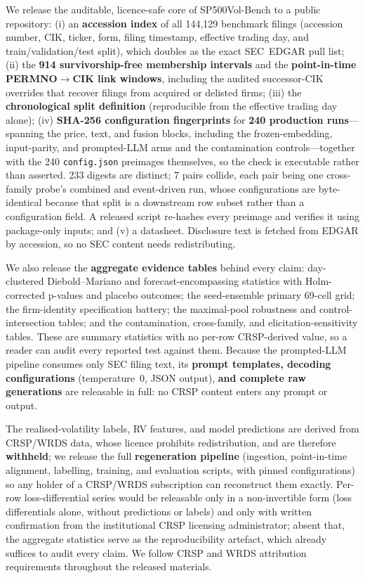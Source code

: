 We release the auditable, licence-safe core of SP500Vol-Bench to a public
repository: (i) an \textbf{accession index} of all 144{,}129 benchmark filings
(accession number, CIK, ticker, form, filing timestamp, effective trading day,
and train/validation/test split), which doubles as the exact SEC~EDGAR pull
list; (ii) the \textbf{914 survivorship-free membership intervals} and the
\textbf{point-in-time PERMNO$\to$CIK link windows}, including the
audited successor-CIK overrides that recover filings from acquired or delisted
firms; (iii) the \textbf{chronological split definition} (reproducible from the
effective trading day alone); (iv) \textbf{SHA-256 configuration fingerprints}
for \textbf{240 production runs}---spanning the price, text, and fusion
blocks, including the frozen-embedding, input-parity, and prompted-LLM arms
and the contamination controls---together with the 240 \texttt{config.json}
preimages themselves, so the check is executable rather than asserted. 233
digests are distinct; 7 pairs collide, each pair being one cross-family probe's
combined and event-driven run, whose configurations are byte-identical because
that split is a downstream row subset rather than a configuration field. A
released script re-hashes every preimage and verifies it using package-only
inputs; and (v) a datasheet. Disclosure text is fetched from EDGAR by accession,
so no SEC content needs redistributing.

We also release the \textbf{aggregate evidence tables} behind every claim:
day-clustered Diebold--Mariano and forecast-encompassing statistics with
Holm-corrected p-values and placebo outcomes; the seed-ensemble primary 69-cell
grid; the firm-identity specification battery; the maximal-pool robustness and
control-intersection tables; and the contamination, cross-family, and
elicitation-sensitivity tables. These are summary statistics with no per-row
CRSP-derived value, so a reader can audit every reported test against them.
Because the prompted-LLM pipeline consumes only SEC filing text, its
\textbf{prompt templates, decoding configurations} (temperature~0, JSON
output), \textbf{and complete raw generations} are releasable in full: no CRSP
content enters any prompt or output.

The realised-volatility labels, RV features, and model predictions are derived
from CRSP/WRDS data, whose licence prohibits redistribution, and are therefore
\textbf{withheld}; we release the full \textbf{regeneration pipeline}
(ingestion, point-in-time alignment, labelling, training, and evaluation
scripts, with pinned configurations) so any holder of a CRSP/WRDS subscription
can reconstruct them exactly. Per-row loss-differential series would be
releasable only in a non-invertible form (loss differentials alone, without
predictions or labels) and only with written confirmation from the
institutional CRSP licensing administrator; absent that, the aggregate
statistics serve as the reproducibility artefact, which already suffices to
audit every claim. We follow CRSP and WRDS attribution requirements throughout
the released materials.
